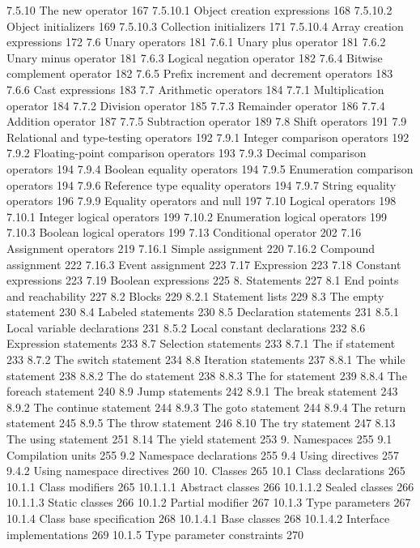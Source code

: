 7.5.10 The new operator	167
7.5.10.1 Object creation expressions	168
7.5.10.2 Object initializers	169
7.5.10.3 Collection initializers	171
7.5.10.4 Array creation expressions	172
7.6 Unary operators	181
7.6.1 Unary plus operator	181
7.6.2 Unary minus operator	181
7.6.3 Logical negation operator	182
7.6.4 Bitwise complement operator	182
7.6.5 Prefix increment and decrement operators	183
7.6.6 Cast expressions	183
7.7 Arithmetic operators	184
7.7.1 Multiplication operator	184
7.7.2 Division operator	185
7.7.3 Remainder operator	186
7.7.4 Addition operator	187
7.7.5 Subtraction operator	189
7.8 Shift operators	191
7.9 Relational and type-testing operators	192
7.9.1 Integer comparison operators	192
7.9.2 Floating-point comparison operators	193
7.9.3 Decimal comparison operators	194
7.9.4 Boolean equality operators	194
7.9.5 Enumeration comparison operators	194
7.9.6 Reference type equality operators	194
7.9.7 String equality operators	196
7.9.9 Equality operators and null	197
7.10 Logical operators	198
7.10.1 Integer logical operators	199
7.10.2 Enumeration logical operators	199
7.10.3 Boolean logical operators	199
7.13 Conditional operator	202
7.16 Assignment operators	219
7.16.1 Simple assignment	220
7.16.2 Compound assignment	222
7.16.3 Event assignment	223
7.17 Expression	223
7.18 Constant expressions	223
7.19 Boolean expressions	225
8. Statements	227
8.1 End points and reachability	227
8.2 Blocks	229
8.2.1 Statement lists	229
8.3 The empty statement	230
8.4 Labeled statements	230
8.5 Declaration statements	231
8.5.1 Local variable declarations	231
8.5.2 Local constant declarations	232
8.6 Expression statements	233
8.7 Selection statements	233
8.7.1 The if statement	233
8.7.2 The switch statement	234
8.8 Iteration statements	237
8.8.1 The while statement	238
8.8.2 The do statement	238
8.8.3 The for statement	239
8.8.4 The foreach statement	240
8.9 Jump statements	242
8.9.1 The break statement	243
8.9.2 The continue statement	244
8.9.3 The goto statement	244
8.9.4 The return statement	245
8.9.5 The throw statement	246
8.10 The try statement	247
8.13 The using statement	251
8.14 The yield statement	253
9. Namespaces	255
9.1 Compilation units	255
9.2 Namespace declarations	255
9.4 Using directives	257
9.4.2 Using namespace directives	260
10. Classes	265
10.1 Class declarations	265
10.1.1 Class modifiers	265
10.1.1.1 Abstract classes	266
10.1.1.2 Sealed classes	266
10.1.1.3 Static classes	266
10.1.2 Partial modifier	267
10.1.3 Type parameters	267
10.1.4 Class base specification	268
10.1.4.1 Base classes	268
10.1.4.2 Interface implementations	269
10.1.5 Type parameter constraints	270
